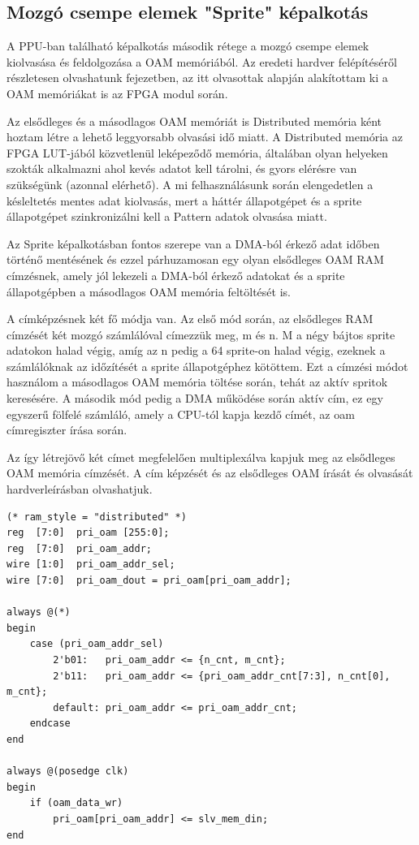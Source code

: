 	\subsection{Mozgó csempe elemek "Sprite" képalkotás}
	\label{sec:fpga-sprite-rendering}

	A PPU-ban található képalkotás második rétege a mozgó csempe elemek kiolvasása és feldolgozása a OAM memóriából. Az eredeti hardver felépítéséről részletesen olvashatunk  fejezetben, az itt olvasottak alapján alakítottam ki a OAM memóriákat is az FPGA modul során. 
	
	Az elsődleges és a másodlagos OAM memóriát is Distributed memória ként hoztam létre a lehető leggyorsabb olvasási idő miatt. A Distributed memória az FPGA LUT-jából közvetlenül leképeződő memória, általában olyan helyeken szokták alkalmazni ahol kevés adatot kell tárolni, és gyors elérésre van szükségünk (azonnal elérhető). A mi felhasználásunk során elengedetlen a késleltetés mentes adat kiolvasás, mert a háttér állapotgépet és a sprite állapotgépet szinkronizálni kell a Pattern adatok olvasása miatt.
	
	Az Sprite képalkotásban fontos szerepe van a DMA-ból érkező adat időben történő mentésének és ezzel párhuzamosan egy olyan elsődleges OAM RAM címzésnek, amely jól lekezeli a DMA-ból érkező adatokat és a sprite állapotgépben a másodlagos OAM memória feltöltését is. 
	
	A címképzésnek két fő módja van. Az első mód során, az elsődleges RAM címzését két mozgó számlálóval címezzük meg, m és n. M a négy bájtos sprite adatokon halad végig, amíg az n pedig a 64 sprite-on halad végig, ezeknek a számlálóknak az időzítését a sprite állapotgéphez kötöttem. Ezt a címzési módot használom a másodlagos OAM memória töltése során, tehát az aktív spritok keresésére. A második mód pedig a DMA működése során aktív cím, ez egy egyszerű fölfelé számláló, amely a CPU-tól kapja kezdő címét, az oam címregiszter írása során.
	
	Az így létrejövő két címet megfelelően multiplexálva kapjuk meg az elsődleges OAM memória címzését. A cím képzését és az elsődleges OAM írását és olvasását  hardverleírásban olvashatjuk.

\begin{lstlisting}[caption={Az elsődleges OAM RAM írása és olvasása}, label={code:Primary-oam}, style=prettyverilog]
(* ram_style = "distributed" *)
reg  [7:0]  pri_oam [255:0];
reg  [7:0]  pri_oam_addr;
wire [1:0]  pri_oam_addr_sel;
wire [7:0]  pri_oam_dout = pri_oam[pri_oam_addr];

always @(*) 
begin
	case (pri_oam_addr_sel)
		2'b01:   pri_oam_addr <= {n_cnt, m_cnt};
		2'b11:   pri_oam_addr <= {pri_oam_addr_cnt[7:3], n_cnt[0], m_cnt}; 
		default: pri_oam_addr <= pri_oam_addr_cnt; 
	endcase    
end

always @(posedge clk) 
begin
	if (oam_data_wr)
		pri_oam[pri_oam_addr] <= slv_mem_din;    
end\end{lstlisting} 

